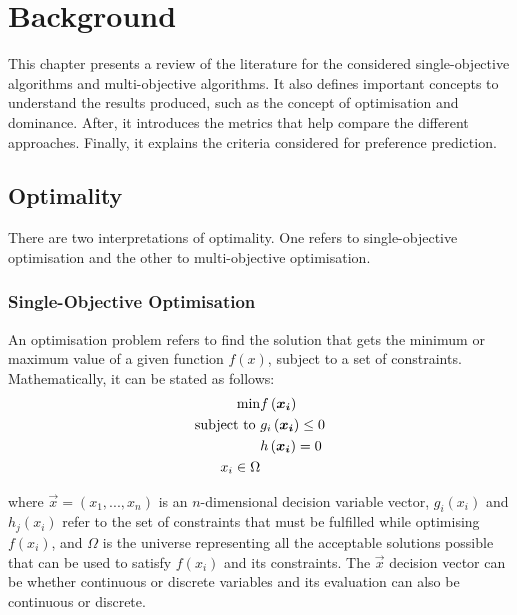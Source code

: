 \chapter{Background}
\label{chapter:chapter02}

This chapter presents a review of the literature for the considered single-objective algorithms and multi-objective algorithms. It also defines important concepts to understand the results produced, such as the concept of optimisation and dominance. After, it introduces the metrics that help compare the different approaches. Finally, it explains the criteria considered for preference prediction.

\section{Optimality}

There are two interpretations of optimality. One refers to single-objective optimisation and the other to multi-objective optimisation.\\

\subsection{Single-Objective Optimisation}

An optimisation problem refers to find the solution that gets the minimum or maximum value of a given function $f(x)$, subject to a set of constraints. Mathematically, it can be stated as follows:\\
 
 \begin{equation}
     \begin{aligned}
     \min & f\left( \boldsymbol{x_i}\right)\\
     \text{subject to } & g_i\left( \boldsymbol{x_i}\right) \leq 0\\
     & h\left( \boldsymbol{x_i}\right) = 0\\
     x_i \in \Omega
     \end{aligned}
 \end{equation}
 
\noindent where $\vec{x} = (x_1,...,x_n)$ is an $n$-dimensional decision variable vector, $g_i(x_i)$ and $h_j(x_i)$ refer to the set of constraints that must be fulfilled while optimising $f(x_i)$, and $\Omega$ is the universe representing all the acceptable solutions possible that can be used to satisfy $f(x_i)$ and its constraints. The $\vec{x}$ decision vector can be whether continuous or discrete variables and its evaluation can also be continuous or discrete.\\

